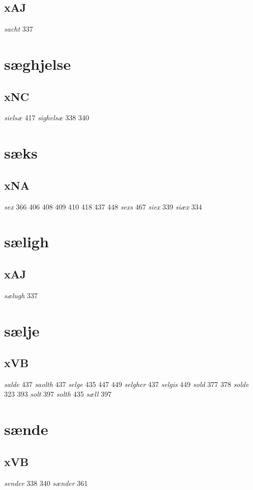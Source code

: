 \documentclass[a4paper,twocolumn]{article}
\begin{document}
\subsection{xAJ}
\label{sec:org8c3510d}
\emph{sacht} 337 
\section{sæghjelse}
\label{sec:orgcd05cf6}
\subsection{xNC}
\label{sec:org6490c32}
\emph{sielsæ} 417 \emph{sighelsæ} 338 340 
\section{sæks}
\label{sec:org5fd8456}
\subsection{xNA}
\label{sec:org3e01c3c}
\emph{sex} 366 406 408 409 410 418 437 448 \emph{sexs} 467 \emph{siex} 339 \emph{siæx} 334 
\section{sæligh}
\label{sec:org857270a}
\subsection{xAJ}
\label{sec:org98c8c13}
\emph{sælugh} 337 
\section{sælje}
\label{sec:orgba1e36a}
\subsection{xVB}
\label{sec:orgcff3d01}
\emph{salde} 437 \emph{saolth} 437 \emph{selge} 435 447 449 \emph{selgher} 437 \emph{selgis} 449 \emph{sold} 377 378 \emph{solde} 323 393 \emph{solt} 397 \emph{solth} 435 \emph{sæll} 397 
\section{sænde}
\label{sec:orgf335ac2}
\subsection{xVB}
\label{sec:orge499f08}
\emph{sender} 338 340 \emph{sænder} 361 
\end{document}

